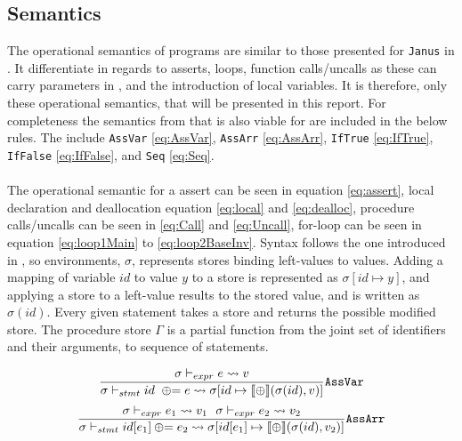 \subsection{Semantics}
The operational semantics of \lan programs are similar to those presented for \texttt{Janus}
in \cite{janus}. It differentiate in regards to asserts, loops, function calls/uncalls
as these can carry parameters in \lan, and the introduction of local
variables. It is therefore, only these operational semantics, that will be presented in this
report. For completeness the semantics from \cite{janus} that is also viable for \lan are
included in the below rules. The include \texttt{AssVar} \eqref{eq:AssVar}, \texttt{AssArr}
\eqref{eq:AssArr}, \texttt{IfTrue} \eqref{eq:IfTrue}, \texttt{IfFalse} \eqref{eq:IfFalse},
and \texttt{Seq} \eqref{eq:Seq}.
\\
\\
The operational semantic for a \lan assert can be seen in equation \eqref{eq:assert},
local declaration and deallocation equation \eqref{eq:local} and \eqref{eq:dealloc},
procedure calls/uncalls can be seen in \eqref{eq:Call} and \eqref{eq:Uncall},
for-loop can be seen in equation \eqref{eq:loop1Main} to
\eqref{eq:loop2BaseInv}. Syntax follows the one introduced in \cite{pld}, so
environments, $\sigma$, represents stores binding left-values
to values. Adding a mapping of variable $id$ to value $y$ to a store is represented as
$\sigma[id \mapsto y]$, and applying a store to a left-value results to the stored value,
and is written as $\sigma(id)$. Every given statement takes a store and returns the possible
modified store. The procedure store $\Gamma$ is a partial function from the joint set
of identifiers and their arguments, to sequence of statements.

\begin{multicols}{2}
    \begin{equation} \label{eq:AssVar}
        \frac{\sigma \vdash_{expr} e \leadsto v}
        {\sigma \vdash_{stmt} id~ \oplus{\kern-5.0pt}= e \leadsto
            \sigma[id \mapsto \llbracket \oplus \rrbracket(\sigma(id), v)]}
        \text{\texttt{AssVar}}
    \end{equation}
    \break
    \begin{equation} \label{eq:AssArr}
        \frac{\sigma \vdash_{expr} e_1 \leadsto v_1 ~~
            \sigma \vdash_{expr} e_2 \leadsto v_2}
        {\sigma \vdash_{stmt} id[e_1] \oplus{\kern-5.0pt}= e_2 \leadsto
            \sigma[id[e_1] \mapsto \llbracket\oplus\rrbracket(\sigma(id), v_2)]}
        \text{\texttt{AssArr}}
    \end{equation}
\end{multicols}

